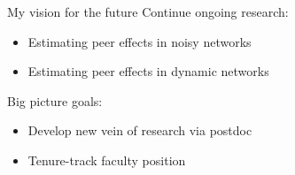 \documentclass[aspectratio=169]{beamer}
\theoremstyle{remark}
\begin{document}
\begin{frame}{My vision for the future}
    Continue ongoing research:
    \begin{itemize}
        \item Estimating peer effects in noisy networks
        \item Estimating peer effects in dynamic networks
    \end{itemize}
    \vspace{4mm}
    
    Big picture goals:
    \begin{itemize}
        \item Develop new vein of research via postdoc
        \item Tenure-track faculty position
    \end{itemize}
\end{frame}

\nocite{hayes2024a,hayes2024b,hayes2024c,wickham2019}
\printbibliography[heading=none]


\end{document}
